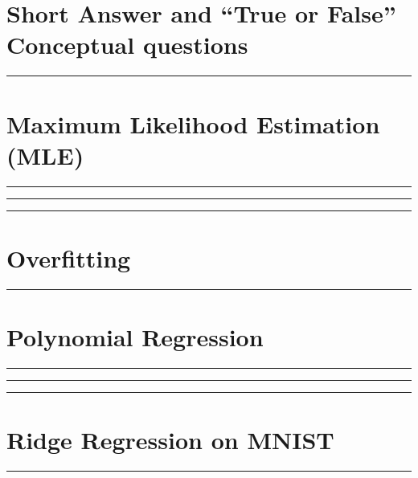 \documentclass{article}
\begin{document}

% 

\section*{Short Answer and ``True or False'' Conceptual questions}
\noindent\rule{\textwidth}{1pt}\vspace{0.75mm}


\section*{Maximum Likelihood Estimation (MLE)}
\noindent\rule{\textwidth}{1pt}\vspace{0.75mm}


\noindent\rule{\textwidth}{1pt}\vspace{0.75mm}


\noindent\rule{\textwidth}{1pt}\vspace{0.75mm}



\section*{Overfitting}
\noindent\rule{\textwidth}{1pt}\vspace{0.75mm}


\section*{Polynomial Regression}
\noindent\rule{\textwidth}{1pt}\vspace{0.75mm}


\noindent\rule{\textwidth}{1pt}\vspace{0.75mm}


\noindent\rule{\textwidth}{1pt}\vspace{0.75mm}


\section*{Ridge Regression on MNIST}
\noindent\rule{\textwidth}{1pt}\vspace{0.75mm}


\end{document}
